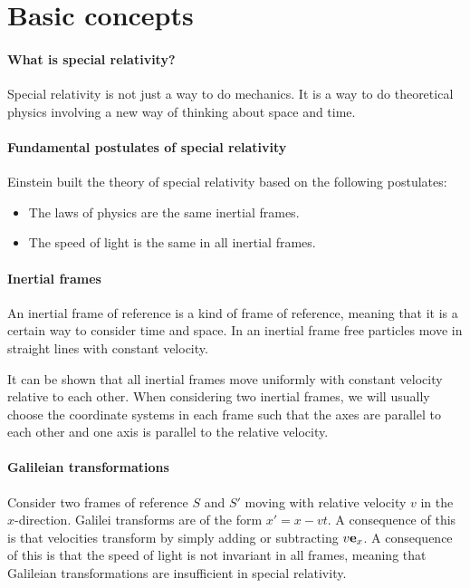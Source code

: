 \section{Basic concepts}

\paragraph{What is special relativity?}
Special relativity is not just a way to do mechanics. It is a way to do theoretical physics involving a new way of thinking about space and time.

\paragraph{Fundamental postulates of special relativity}
Einstein built the theory of special relativity based on the following postulates:

\begin{itemize}
	\item The laws of physics are the same inertial frames.
	\item The speed of light is the same in all inertial frames.
\end{itemize}

\paragraph{Inertial frames}
An inertial frame of reference is a kind of frame of reference, meaning that it is a certain way to consider time and space. In an inertial frame free particles move in straight lines with constant velocity.

It can be shown that all inertial frames move uniformly with constant velocity relative to each other. When considering two inertial frames, we will usually choose the coordinate systems in each frame such that the axes are parallel to each other and one axis is parallel to the relative velocity.

\paragraph{Galileian transformations}
Consider two frames of reference $S$ and $S'$ moving with relative velocity $v$ in the $x$-direction. Galilei transforms are of the form $x' = x - vt$. A consequence of this is that velocities transform by simply adding or subtracting $v\vb{e}_{x}$. A consequence of this is that the speed of light is not invariant in all frames, meaning that Galileian transformations are insufficient in special relativity.

